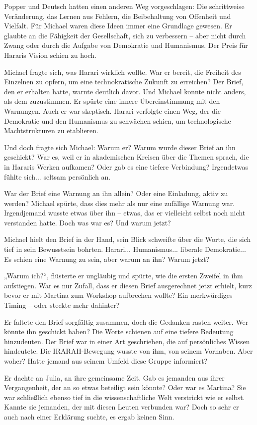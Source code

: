 \documentclass[
]{article}
\begin{document}
Popper und Deutsch hatten einen anderen Weg vorgeschlagen: Die
schrittweise Veränderung, das Lernen aus Fehlern, die Beibehaltung von
Offenheit und Vielfalt. Für Michael waren diese Ideen immer eine
Grundlage gewesen. Er glaubte an die Fähigkeit der Gesellschaft, sich zu
verbessern -- aber nicht durch Zwang oder durch die Aufgabe von
Demokratie und Humanismus. Der Preis für Hararis Vision schien zu hoch.

Michael fragte sich, was Harari wirklich wollte. War er bereit, die
Freiheit des Einzelnen zu opfern, um eine technokratische Zukunft zu
erreichen? Der Brief, den er erhalten hatte, warnte deutlich davor. Und
Michael konnte nicht anders, als dem zuzustimmen. Er spürte eine innere
Übereinstimmung mit den Warnungen. Auch er war skeptisch. Harari
verfolgte einen Weg, der die Demokratie und den Humanismus zu schwächen
schien, um technologische Machtstrukturen zu etablieren.

Und doch fragte sich Michael: Warum er? Warum wurde dieser Brief an ihn
geschickt? War es, weil er in akademischen Kreisen über die Themen
sprach, die in Hararis Werken aufkamen? Oder gab es eine tiefere
Verbindung? Irgendetwas fühlte sich... seltsam persönlich an.

War der Brief eine Warnung an ihn allein? Oder eine Einladung, aktiv zu
werden? Michael spürte, dass dies mehr als nur eine zufällige Warnung
war. Irgendjemand wusste etwas über ihn -- etwas, das er vielleicht
selbst noch nicht verstanden hatte. Doch was war es? Und warum jetzt?

Michael hielt den Brief in der Hand, sein Blick schweifte über die
Worte, die sich tief in sein Bewusstsein bohrten. Harari...
Humanismus... liberale Demokratie... Es schien eine Warnung zu sein,
aber warum an ihn? Warum jetzt?

„Warum ich?{\kern0pt}``, flüsterte er ungläubig und spürte, wie die
ersten Zweifel in ihm aufstiegen. War es nur Zufall, dass er diesen
Brief ausgerechnet jetzt erhielt, kurz bevor er mit Martina zum Workshop
aufbrechen wollte? Ein merkwürdiges Timing -- oder steckte mehr
dahinter?

Er faltete den Brief sorgfältig zusammen, doch die Gedanken rasten
weiter. Wer könnte ihn geschickt haben? Die Worte schienen auf eine
tiefere Bedeutung hinzudeuten. Der Brief war in einer Art geschrieben,
die auf persönliches Wissen hindeutete. Die IRARAH-Bewegung wusste von
ihm, von seinem Vorhaben. Aber woher? Hatte jemand aus seinem Umfeld
diese Gruppe informiert?

Er dachte an Julia, an ihre gemeinsame Zeit. Gab es jemanden aus ihrer
Vergangenheit, der an so etwas beteiligt sein könnte? Oder war es
Martina? Sie war schließlich ebenso tief in die wissenschaftliche Welt
verstrickt wie er selbst. Kannte sie jemanden, der mit diesen Leuten
verbunden war? Doch so sehr er auch nach einer Erklärung suchte, es
ergab keinen Sinn.
\end{document}
